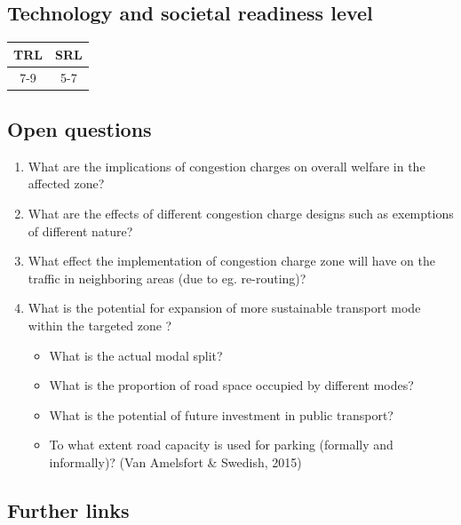 \documentclass[
]{book}
\providecommand{\tightlist}{%
  \setlength{\itemsep}{0pt}\setlength{\parskip}{0pt}}
\begin{document}
\hypertarget{technology-and-societal-readiness-level-4}{%
\subsection*{Technology and societal readiness level}\label{technology-and-societal-readiness-level-4}}

\begin{longtable}[]{@{}cc@{}}
\toprule
TRL & SRL\tabularnewline
\midrule
\endhead
7-9 & 5-7\tabularnewline
\bottomrule
\end{longtable}

\hypertarget{open-questions-4}{%
\subsection*{Open questions}\label{open-questions-4}}

\begin{enumerate}
\def\labelenumi{\arabic{enumi}.}
\tightlist
\item
  What are the implications of congestion charges on overall welfare in the affected zone?
\item
  What are the effects of different congestion charge designs such as exemptions of different nature?
\item
  What effect the implementation of congestion charge zone will have on the traffic in neighboring areas (due to eg. re-routing)?
\item
  What is the potential for expansion of more sustainable transport mode within the targeted zone ?

  \begin{itemize}
  \tightlist
  \item
    What is the actual modal split?
  \item
    What is the proportion of road space occupied by different modes?
  \item
    What is the potential of future investment in public transport?
  \item
    To what extent road capacity is used for parking (formally and informally)? (Van Amelsfort \& Swedish, 2015)
  \end{itemize}
\end{enumerate}

\hypertarget{further-links-3}{%
\subsection*{Further links}\label{further-links-3}}
\end{document}
